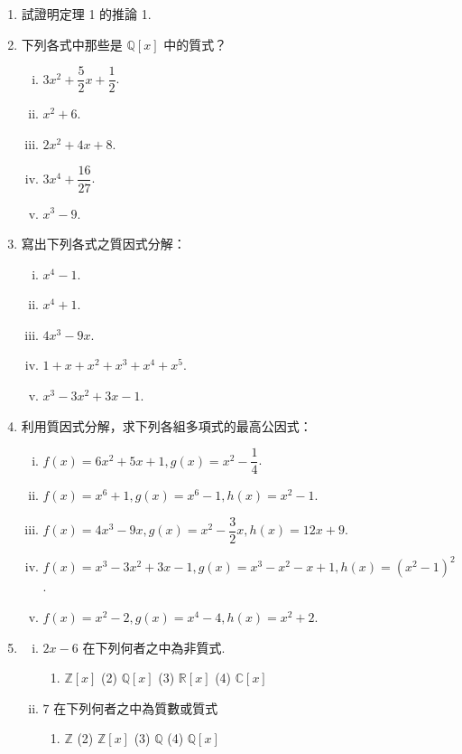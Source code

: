 \begin{enumerate}[1.]
  \item 試證明定理 1 的推論 1.

  \item 下列各式中那些是 $\mathbb{Q}[x]$ 中的質式？
  \begin{enumerate}[(i)]
    \item $3x^2+\dfrac{5}{2}x+\dfrac{1}{2}$.
    \item $x^2+6$.
    \item $2x^2+4x+8$.
    \item $3x^4+\dfrac{16}{27}$.
    \item $x^3-9$.
  \end{enumerate}

  \item 寫出下列各式之質因式分解：
  \begin{enumerate}[(i)]
    \item $x^4-1$.
    \item $x^4+1$.
    \item $4x^3-9x$.
    \item $1+x+x^2+x^3+x^4+x^5$.
    \item $x^3-3x^2+3x-1$.
  \end{enumerate}

  \item 利用質因式分解，求下列各組多項式的最高公因式：
  \begin{enumerate}[(i)]
    \item $f(x) = 6x^2+5x+1, g(x) = x^2-\dfrac{1}{4}$.
    \item $f(x) = x^6+1, g(x) = x^6-1, h(x) = x^2-1$.
    \item $f(x) = 4x^3-9x, g(x) = x^2-\dfrac{3}{2}x, h(x) = 12x+9$.
    \item $f(x) = x^3-3x^2+3x-1, g(x) = x^3-x^2-x+1, h(x) = (x^2-1)^2$.
    \item $f(x) = x^2-2, g(x) = x^4-4, h(x) = x^2+2$.
  \end{enumerate}

  \item 
  \begin{enumerate}[(i)]
    \item $2x-6$ 在下列何者之中為非質式.
    \begin{enumerate}[(1)]
      \item $\mathbb{Z}[x]$ \quad (2) $\mathbb{Q}[x]$ \quad (3) $\mathbb{R}[x]$ \quad (4) $\mathbb{C}[x]$
    \end{enumerate}
    \item $7$ 在下列何者之中為質數或質式
    \begin{enumerate}[(1)]
      \item $\mathbb{Z}$ \quad (2) $\mathbb{Z}[x]$ \quad (3) $\mathbb{Q}$ \quad (4) $\mathbb{Q}[x]$
    \end{enumerate}
  \end{enumerate}


\end{enumerate}
